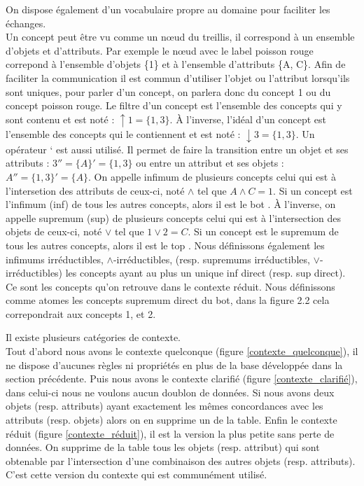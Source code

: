 On dispose également d'un vocabulaire propre au domaine pour faciliter les échanges.\\
Un concept peut être vu comme un n\oe ud du treillis, il correspond à un ensemble d'objets et d'attributs. Par exemple le n\oe ud avec le label \guillemotleft{} poisson rouge \guillemotright{} correpond à l'ensemble d'objets \{1\} et à l'ensemble d'attributs \{A, C\}. Afin de faciliter la communication il est commun d'utiliser l'objet ou l'attribut lorsqu'ils sont uniques, pour parler d'un concept, on parlera donc du concept 1 ou du concept poisson rouge. Le filtre d'un concept est l'ensemble des concepts qui y sont contenu et est noté : $\uparrow \! 1 = \{1, 3\}$. À l'inverse, l'idéal d'un concept est l'ensemble des concepts qui le contiennent et est noté : $\downarrow \! 3 = \{1, 3\}$. Un opérateur \guillemotleft{} ` \guillemotright{} est aussi utilisé. Il permet de faire la transition entre un objet et ses attributs : $3'' = \{A\}' = \{1, 3\}$ ou entre un attribut et ses objets : $A'' = \{1, 3\}' = \{A\}$. On appelle infimum de plusieurs concepts celui qui est à l'intersetion des attributs de ceux-ci, noté $\wedge$ tel que $A \wedge C = 1$. Si un concept est l'infimum (inf) de tous les autres concepts, alors il est le \guillemotleft{} bot \guillemotright{}. À l'inverse, on appelle supremum (sup) de plusieurs concepts celui qui est à l'intersection des objets de ceux-ci, noté $\vee$ tel que $1 \vee 2 = C$. Si un concept est le supremum de tous les autres concepts, alors il est le \guillemotleft{} top \guillemotright{}. Nous définissons également les infimums irréductibles, $\wedge$-irréductibles, (resp. supremums irréductibles, $\vee$-irréductibles) les concepts ayant au plus un unique inf direct (resp. sup direct). Ce sont les concepts qu'on retrouve dans le contexte réduit. Nous définissons comme atomes les concepts supremum direct du bot, dans la figure 2.2 cela correpondrait aux concepts 1, et 2.

\bigbreak

Il existe plusieurs catégories de contexte.\\
Tout d'abord nous avons le contexte quelconque (figure \ref{contexte_quelconque}), il ne dispose d'aucunes règles ni propriétés en plus de la base développée dans la section précédente. Puis nous avons le contexte clarifié (figure \ref{contexte_clarifié}), dans celui-ci nous ne voulons aucun doublon de données. Si nous avons deux objets (resp. attributs) ayant exactement les mêmes concordances avec les attributs (resp. objets) alors on en supprime un de la table. Enfin le contexte réduit (figure \ref{contexte_réduit}), il est la version la plus petite sans perte de données. On supprime de la table tous les objets (resp. attribut) qui sont obtenable par l'intersection d'une combinaison des autres objets (resp. attributs). C'est cette version du contexte qui est communément utilisé.

